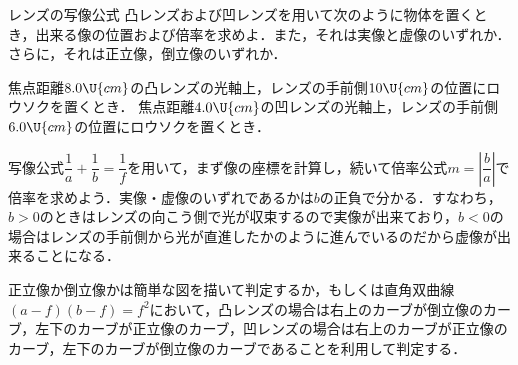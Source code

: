 \begin{reidaiunit}
\begin{reidai}{レンズの写像公式}
\hspace{1zw}凸レンズおよび凹レンズを用いて次のように物体を置くとき，出来る像の位置および倍率を求めよ．また，それは実像と虚像のいずれか．さらに，それは正立像，倒立像のいずれか．
\begin{komon}
 焦点距離$8.0\U{cm}$の凸レンズの光軸上，レンズの手前側$10\U{cm}$の位置にロウソクを置くとき．
 焦点距離$4.0\U{cm}$の凹レンズの光軸上，レンズの手前側$6.0\U{cm}$の位置にロウソクを置くとき．
\end{komon}
\end{reidai}

\begin{sisinE}
写像公式$\dfrac{1}{a}+\dfrac{1}{b}=\dfrac{1}{f}$を用いて，まず像の座標を計算し，続いて倍率公式$m=\left|\dfrac{b}{a}\right|$で倍率を求めよう．実像・虚像のいずれであるかは$b$の正負で分かる．すなわち，$b>0$のときはレンズの向こう側で光が収束するので実像が出来ており，$b<0$の場合はレンズの手前側から光が直進したかのように進んでいるのだから虚像が出来ることになる．

正立像か倒立像かは簡単な図を描いて判定するか，もしくは{\gtfamily 直角双曲線$(a-f)(b-f)=f^2$}において，凸レンズの場合は右上のカーブが倒立像のカーブ，左下のカーブが正立像のカーブ，凹レンズの場合は右上のカーブが正立像のカーブ，左下のカーブが倒立像のカーブであることを利用して判定する．
\end{sisinE}



\end{reidaiunit}
